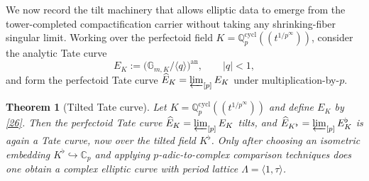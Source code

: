 \documentclass[11pt]{article}
\newtheorem{theorem}{Theorem}[section]
\theoremstyle{remark}
\newcommand{\G}{\mathbb{G}}
\newcommand{\C}{\mathbb{C}}
\newcommand{\Q}{\mathbb{Q}}
\begin{document}
We now record the tilt machinery that allows elliptic data to emerge from the tower-completed compactification carrier without taking any shrinking-fiber singular limit. Working over the perfectoid field \(K=\Q_p^{\mathrm{cycl}}((t^{1/p^\infty}))\), consider the analytic Tate curve
\begin{equation}\label{26}
E_K:=\bigl(\G_{m,K}/\langle q\rangle\bigr)^{\mathrm{an}},\qquad |q|<1,
\end{equation}
and form the perfectoid Tate curve \(\widehat{E}_K=\varprojlim_{[p]} E_K\) under multiplication-by-\(p\).
\begin{theorem}[Tilted Tate curve]
Let \(K=\Q_p^{\mathrm{cycl}}((t^{1/p^\infty}))\) and define \(E_K\) by \eqref{26}. Then the perfectoid Tate curve \(\widehat{E}_K=\varprojlim_{[p]}E_K\) tilts, and \(\widehat{E}_{K^\flat}=\varprojlim_{[p]}E^\flat_K\) is again a Tate curve, now over the tilted field \(K^\flat\). Only after choosing an isometric embedding \(K^\flat\hookrightarrow \C_p\) and applying \(p\)-adic-to-complex comparison techniques does one obtain a complex elliptic curve with period lattice \(\Lambda=\langle 1,\tau\rangle\).
\end{theorem}
\end{document}
